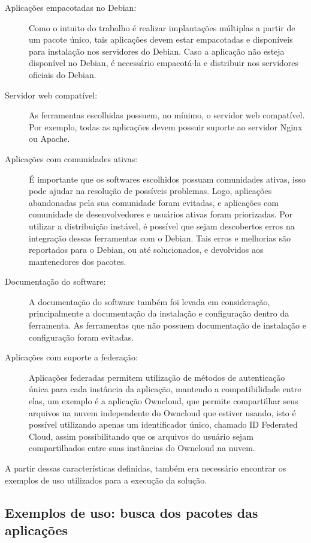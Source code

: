 \begin{description}
  \item  [Aplicações empacotadas no Debian:] Como o intuito do trabalho
  é realizar implantações múltiplas a partir de um pacote único, tais aplicações
  devem estar empacotadas e disponíveis para instalação nos servidores do Debian. Caso
a aplicação não esteja disponível no Debian, é necessário empacotá-la e distribuir
nos servidores oficiais do Debian.
 \item  [Servidor web compatível:] As ferramentas escolhidas possuem, no
  mínimo, o servidor web compatível. Por exemplo, todas as aplicações devem 
possuir suporte ao servidor Nginx ou Apache.
  \item  [Aplicações com comunidades ativas:] É importante que os softwares 
escolhidos possuam comunidades ativas, isso pode ajudar na resolução de possíveis 
problemas. Logo, aplicações abandonadas pela sua comunidade foram evitadas, e
  aplicações com comunidade de desenvolvedores e usuários ativas foram priorizadas.
  Por utilizar a distribuição instável, é possível que sejam descobertos
  erros na integração dessas ferramentas com o Debian. Tais erros e melhorias são
  reportados para o Debian, ou até solucionados, e 
  devolvidos aos mantenedores dos pacotes.
  \item  [Documentação do software:] A documentação do software também foi
  levada em consideração, principalmente a documentação da instalação e configuração
  dentro da ferramenta. As ferramentas que não possuem documentação de instalação e
  configuração foram evitadas.
  \item  [Aplicações com suporte a federação:] Aplicações federadas permitem
 utilização de métodos de autenticação única para cada instância da aplicação,
mantendo a compatibilidade entre elas, um exemplo é a aplicação Owncloud,
que permite compartilhar seus arquivos na nuvem independente do Owncloud que estiver usando,
isto é possível utilizando apenas um identificador único, chamado ID Federated Cloud, assim
possibilitando que os arquivos do usuário sejam compartilhados entre suas instâncias do
Owncloud na nuvem.
\end{description}

A partir dessas características definidas, também era necessário encontrar os exemplos de uso
utilizados para a execução da solução.

\subsection{Exemplos de uso: busca dos pacotes das aplicações}
\label{subsection:exemplos}

